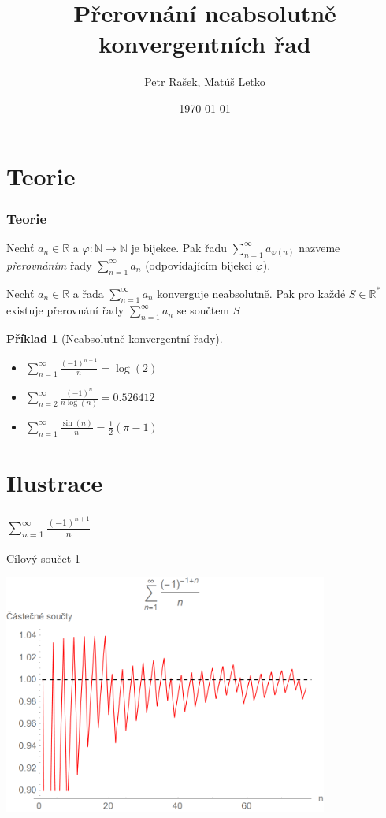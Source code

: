 \documentclass{beamer}
\title[Přerovnání řad]{Přerovnání neabsolutně konvergentních řad}
\author{Petr Rašek, Matúš Letko}
\institute[Charles University]{Charles University, Czech Republic}
\date{\today}
\newtheorem{exercise}[theorem]{Příklad}
\begin{document}
\begin{frame}
\titlepage

\end{frame}

\section{Teorie}
\label{sec:introduction}


\begin{frame}
  \frametitle{Teorie}
  \begin{Definition}
  Nechť \(a_n \in \mathbb{R}\) a \(\varphi : \mathbb{N} \rightarrow \mathbb{N}\) je bijekce. Pak řadu 
  \(\sum _{n=1} ^{\infty} a_{\varphi(n)}\) nazveme \textit{přerovnáním} řady \(\sum _{n=1} ^{\infty} a_n\) (odpovídajícím bijekci \(\varphi\)).
  \end{Definition}
  \begin{Theorem}[Riemannova] 
  \normalfont Nechť \(a_n \in \mathbb{R}\) a řada \(\sum _{n=1} ^{\infty} a_n\) konverguje neabsolutně. Pak pro každé \(S \in \mathbb{R} ^\ast\) existuje přerovnání řady \(\sum _{n=1} ^{\infty} a_n\) se součtem \(S\)
  \end{Theorem}
  \begin{exercise}[Neabsolutně konvergentní řady]
    \begin{itemize}
        \item \(\sum _{n=1} ^{\infty} \frac{(-1)^{n+1}}{n} = \log(2)\)
        \item \(\sum _{n=2} ^{\infty} \frac{(-1)^{n}}{n\log(n)} = 0.526412\)
        \item \(\sum _{n=1} ^{\infty} \frac{\sin(n)}{n} = \frac{1}{2}(\pi - 1)\)
    \end{itemize}
  \end{exercise}
\end{frame}

\section{Ilustrace}
\begin{frame}
  \frametitle{\(\sum _{n=1} ^{\infty} \frac{(-1)^{n+1}}{n}\)}
  Cílový součet 1
  \begin{center}
    \includegraphics[width=0.8\textwidth]{serie1_1.png}
  \end{center}
\end{frame}
\end{document}
